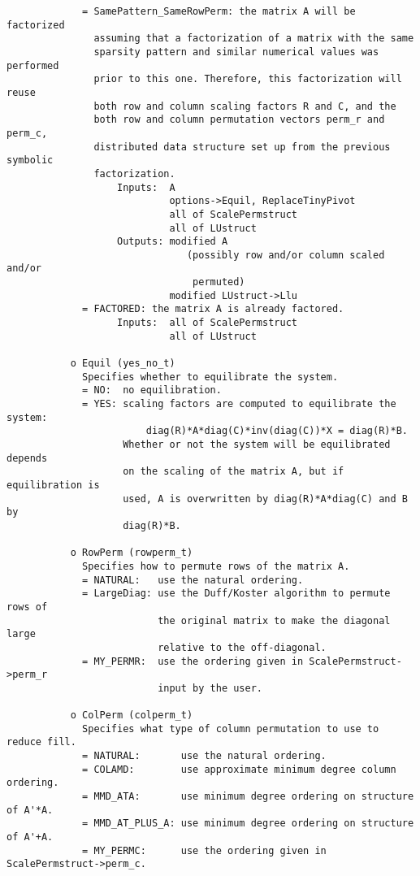 \begin{verbatim}
             = SamePattern_SameRowPerm: the matrix A will be factorized
               assuming that a factorization of a matrix with the same
               sparsity	pattern and similar numerical values was performed
               prior to this one. Therefore, this factorization will reuse
               both row and column scaling factors R and C, and the
               both row and column permutation vectors perm_r and perm_c,
               distributed data structure set up from the previous symbolic
               factorization.
                   Inputs:  A
                            options->Equil, ReplaceTinyPivot
                            all of ScalePermstruct
                            all of LUstruct
                   Outputs: modified A
                               (possibly row and/or column scaled and/or 
                                permuted)
                            modified LUstruct->Llu
             = FACTORED: the matrix A is already factored.
                   Inputs:  all of ScalePermstruct
                            all of LUstruct
  
           o Equil (yes_no_t)
             Specifies whether to equilibrate the system.
             = NO:  no equilibration.
             = YES: scaling factors are computed to equilibrate the system:
                        diag(R)*A*diag(C)*inv(diag(C))*X = diag(R)*B.
                    Whether or not the system will be equilibrated depends
                    on the scaling of the matrix A, but if equilibration is
                    used, A is overwritten by diag(R)*A*diag(C) and B by
                    diag(R)*B.
  
           o RowPerm (rowperm_t)
             Specifies how to permute rows of the matrix A.
             = NATURAL:   use the natural ordering.
             = LargeDiag: use the Duff/Koster algorithm to permute rows of
                          the original matrix to make the diagonal large
                          relative to the off-diagonal.
             = MY_PERMR:  use the ordering given in ScalePermstruct->perm_r
                          input by the user.
             
           o ColPerm (colperm_t)
             Specifies what type of column permutation to use to reduce fill.
             = NATURAL:       use the natural ordering.
             = COLAMD:        use approximate minimum degree column ordering.
             = MMD_ATA:       use minimum degree ordering on structure of A'*A.
             = MMD_AT_PLUS_A: use minimum degree ordering on structure of A'+A.
             = MY_PERMC:      use the ordering given in ScalePermstruct->perm_c.


\end{verbatim}
